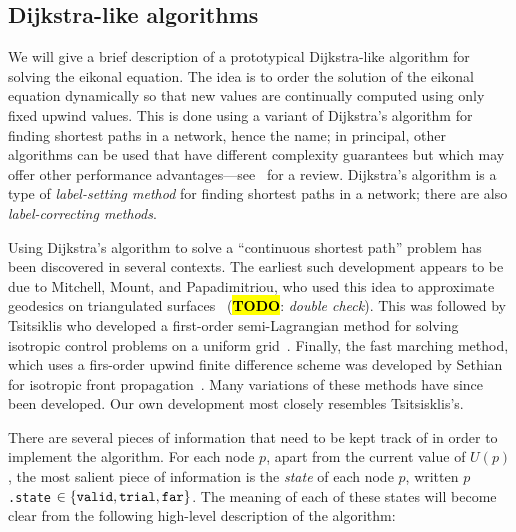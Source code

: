 \documentclass[eikonal.tex]{subfiles}
\begin{document}
\subsection{Dijkstra-like algorithms}\label{ssec:dijkstra-like}
We will give a brief description of a prototypical Dijkstra-like
algorithm for solving the eikonal equation. The idea is to order the
solution of the eikonal equation dynamically so that new values are
continually computed using only fixed upwind values. This is done
using a variant of Dijkstra's algorithm for finding shortest paths in
a network, hence the name; in principal, other algorithms can be used
that have different complexity guarantees but which may offer other
performance advantages---see~\cite{chacon2012fast} for a
review. Dijkstra's algorithm is a type of \emph{label-setting method}
for finding shortest paths in a network; there are also
\emph{label-correcting methods}.

Using Dijkstra's algorithm to solve a ``continuous shortest path''
problem has been discovered in several contexts. The earliest such
development appears to be due to Mitchell, Mount, and Papadimitriou,
who used this idea to approximate geodesics on triangulated
surfaces~\cite{mitchell1987discrete} (\hl{\textbf{TODO}}: \emph{double
  check}). This was followed by Tsitsiklis who developed a first-order
semi-Lagrangian method for solving isotropic control problems on a
uniform grid~\cite{tsitsiklis1995efficient}. Finally, the fast
marching method, which uses a firs-order upwind finite difference
scheme was developed by Sethian for isotropic front
propagation~\cite{sethian1996fast}. Many variations of these methods
have since been developed. Our own development most closely resembles
Tsitsisklis's.

There are several pieces of information that need to be kept track of
in order to implement the algorithm. For each node $p$, apart from the
current value of $U(p)$, the most salient piece of information is the
\emph{state} of each node $p$, written $p$\texttt{.state}
$\in \left\{\texttt{valid}, \texttt{trial}, \texttt{far}\right\}$. The meaning
of each of these states will become clear from the following
high-level description of the algorithm:
\end{document}
